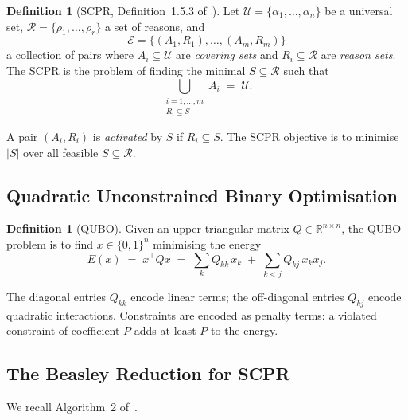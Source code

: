 \documentclass[11pt,a4paper]{article}
\theoremstyle{plain}
\theoremstyle{definition}
\newtheorem{definition}[theorem]{Definition}
\theoremstyle{remark}
\newcommand{\U}{\mathcal{U}}
\newcommand{\R}{\mathcal{R}}
\newcommand{\E}{\mathcal{E}}
\newcommand{\SCPR}{\textup{SCPR}}
\newcommand{\QUBO}{\textup{QUBO}}
\newcommand{\abs}[1]{\lvert #1 \rvert}
\newcommand{\set}[1]{\{#1\}}
\begin{document}
\begin{definition}[\SCPR{}, Definition~1.5.3 of~\cite{babatunde2025thesis}]
\label{def:scpr}
Let $\U = \set{\alpha_1, \ldots, \alpha_n}$ be a universal set,
$\R = \set{\rho_1, \ldots, \rho_r}$ a set of reasons, and
\[
  \E = \set{(A_1, R_1), \ldots, (A_m, R_m)}
\]
a collection of pairs where $A_i \subseteq \U$ are \emph{covering sets} and
$R_i \subseteq \R$ are \emph{reason sets}.
The \SCPR{} is the problem of finding the minimal $S \subseteq \R$ such that
\[
  \bigcup_{\substack{i=1,\ldots,m \\ R_i \subseteq S}} A_i \;=\; \U.
\]
\end{definition}

A pair $(A_i, R_i)$ is \emph{activated} by $S$ if $R_i \subseteq S$.
The \SCPR{} objective is to minimise $\abs{S}$ over all feasible $S \subseteq \R$.

\subsection{Quadratic Unconstrained Binary Optimisation}

\begin{definition}[\QUBO{}]
\label{def:qubo}
Given an upper-triangular matrix $Q \in \mathbb{R}^{n \times n}$,
the \QUBO{} problem is to find $x \in \set{0,1}^n$ minimising the energy
\[
  E(x) \;=\; x^\top Q x \;=\; \sum_{k} Q_{kk}\, x_k \;+\; \sum_{k < j} Q_{kj}\, x_k x_j.
\]
\end{definition}

The diagonal entries $Q_{kk}$ encode linear terms; the off-diagonal entries $Q_{kj}$
encode quadratic interactions.
Constraints are encoded as penalty terms: a violated constraint of coefficient $P$
adds at least $P$ to the energy.

\subsection{The Beasley Reduction for \SCPR{}}

We recall Algorithm~2 of~\cite{babatunde2025thesis}.
\end{document}

